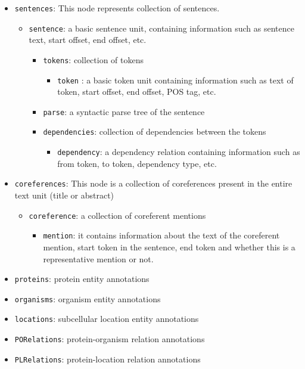 \begin{enumerate}
\begin{itemize}
\item \texttt{sentences}: This node represents collection of sentences.
  \begin{itemize}
  \item \texttt{sentence}: a basic sentence unit, containing information such as sentence text, start offset, end offset, etc.
    \begin{itemize}
	\item \texttt{tokens}: collection of tokens
	  \begin{itemize}	  
	  \item \texttt{token}	: a basic token unit containing information such as text of token, start offset, end offset, POS tag, etc.		
	  \end{itemize}
	\item \texttt{parse}: a syntactic parse tree of the sentence
	\item \texttt{dependencies}: collection of dependencies between the tokens	  
	  \begin{itemize}
	  \item \texttt{dependency}: a dependency relation containing information such as from token, to token, dependency type, etc.
	  \end{itemize}	  
	\end{itemize}	
  \end{itemize}
  \item \texttt{coreferences}:
    This node is a collection of coreferences present in the entire text unit (title or abstract)
    \begin{itemize}
    \item \texttt{coreference}: a collection of coreferent mentions
    \begin{itemize}
      \item \texttt{mention}: it contains information about the text of the coreferent mention, start token in the sentence, end token and whether this is a representative mention or not.
    \end{itemize}
    \end{itemize}

\item \texttt{proteins}: protein entity annotations
\item \texttt{organisms}: organism entity annotations
\item \texttt{locations}: subcellular location entity annotations
\item \texttt{PORelations}: protein-organism relation annotations
\item \texttt{PLRelations}: protein-location relation annotations
\end{itemize}


\end{enumerate}

